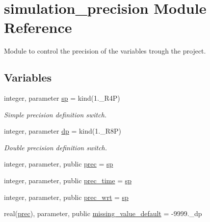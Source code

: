 \hypertarget{namespacesimulation__precision}{}\section{simulation\+\_\+precision Module Reference}
\label{namespacesimulation__precision}


Module to control the precision of the variables trough the project.  


\subsection*{Variables}
\begin{DoxyCompactItemize}
\item 
integer, parameter \mbox{\hyperlink{namespacesimulation__precision_a3657003647318cfe37c797ab37448a2e}{sp}} = kind(1.\+\_\+\+R4P)
\begin{DoxyCompactList}\small\item\em Simple precision definition switch. \end{DoxyCompactList}\item 
integer, parameter \mbox{\hyperlink{namespacesimulation__precision_af01fc62f503e0ff9a95c9ee2960c9a7f}{dp}} = kind(1.\+\_\+\+R8P)
\begin{DoxyCompactList}\small\item\em Double precision definition switch. \end{DoxyCompactList}\item 
integer, parameter, public \mbox{\hyperlink{namespacesimulation__precision_a6d3bcd3b4ff2cfb92ec9fe36ecad405b}{prec}} = \mbox{\hyperlink{namespacesimulation__precision_a3657003647318cfe37c797ab37448a2e}{sp}}
\item 
integer, parameter, public \mbox{\hyperlink{namespacesimulation__precision_a09a1db15abeed81ff2f54b363128ffed}{prec\+\_\+time}} = \mbox{\hyperlink{namespacesimulation__precision_a3657003647318cfe37c797ab37448a2e}{sp}}
\item 
integer, parameter, public \mbox{\hyperlink{namespacesimulation__precision_a049e8de4fad9c285d2cc71e8982e2971}{prec\+\_\+wrt}} = \mbox{\hyperlink{namespacesimulation__precision_a3657003647318cfe37c797ab37448a2e}{sp}}
\item 
real(\mbox{\hyperlink{namespacesimulation__precision_a6d3bcd3b4ff2cfb92ec9fe36ecad405b}{prec}}), parameter, public \mbox{\hyperlink{namespacesimulation__precision_a5983f631bbe7a6e5d43d2a458db81460}{missing\+\_\+value\+\_\+default}} = -\/9999.\+\_\+dp

\end{DoxyCompactItemize}
